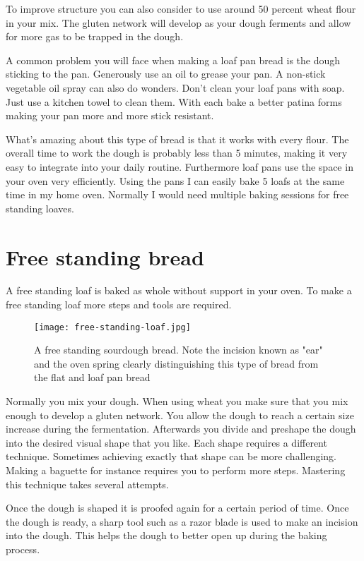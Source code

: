 To improve structure you can also consider to use around 50 percent
wheat flour in your mix. The gluten network will develop as your
dough ferments and allow for more gas to be trapped in the dough.

A common problem you will face when making a loaf pan bread is
the dough sticking to the pan. Generously use an oil to grease
your pan. A non-stick vegetable oil spray can also do wonders.
Don't clean your loaf pans with soap. Just use a kitchen towel
to clean them. With each bake a better patina forms making your
pan more and more stick resistant.

What's amazing about this type of bread is that it works
with every flour. The overall time to work the dough is probably
less than 5 minutes, making it very easy to integrate
into your daily routine. Furthermore loaf pans use the space
in your oven very efficiently. Using the pans I can
easily bake 5 loafs at the same time in my home oven.
Normally I would need multiple baking sessions for
free standing loaves.

\section{Free standing bread}

A free standing loaf is baked as whole without support
in your oven. To make a free standing loaf more steps
and tools are required.

\begin{figure}[!htb]
  \texttt{[image: free-standing-loaf.jpg]}
  \centering
  \caption{A free standing sourdough bread. Note the incision known as "ear" and the oven spring clearly
  distinguishing this type of bread from the flat and loaf pan bread}
\end{figure}

Normally you mix your dough. When using wheat you make sure
that you mix enough to develop a gluten network.
You allow the dough to reach
a certain size increase during the fermentation. Afterwards you divide and preshape
the dough into the desired visual shape that you like.
Each shape requires a different technique. Sometimes achieving
exactly that shape can be more challenging. Making a baguette
for instance requires you to perform more steps. Mastering this
technique takes several attempts.

Once the dough is shaped it is proofed again for a certain
period of time. Once the dough is ready, a sharp tool such
as a razor blade is used to make an incision into the dough.
This helps the dough to better open up during the baking process.

